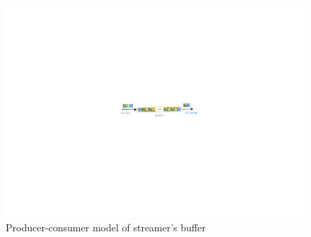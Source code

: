 \begin{figure}[t]
\centering
\includegraphics[width=0.9\columnwidth]{fig/drop.pdf}
\vspace{-0.08in}
\caption{Producer-consumer model of streamer's buffer}
\vspace{-0.1in}
\label{fig_drop}
\end{figure} 